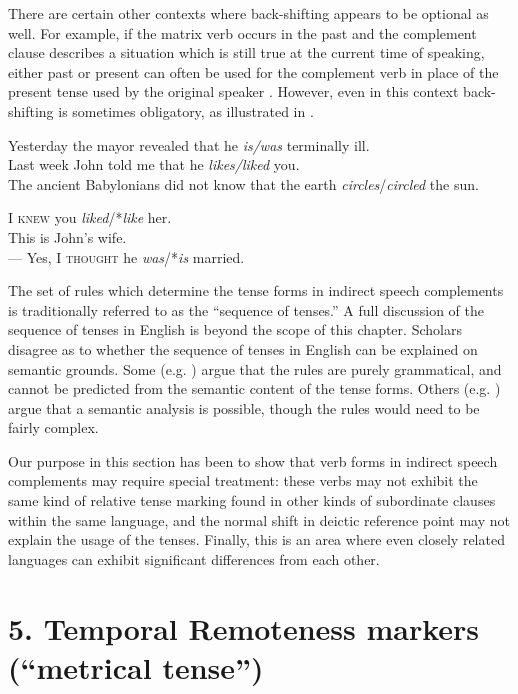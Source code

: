 There are certain other contexts where back-shifting appears to be optional as well. For example, if the matrix verb occurs in the past and the complement clause describes a situation which is still true at the current time of speaking, either past or present can often be used for the complement verb in place of the present tense used by the original speaker . However, even in this context back-shifting is sometimes obligatory, as illustrated in .


\ea
\ea Yesterday the mayor revealed that he \textit{is/was} terminally ill.\\
\ex Last week John told me that he \textit{likes/liked} you.\\
\ex The ancient Babylonians did not know that the earth \textit{circles}/\textit{circled} the sun.
                       \z
\z

\ea
\ea I \textsc{knew} you \textit{liked}/*\textit{like} her.\\
\ex This is John’s wife.\\
  — Yes, I \textsc{thought} he \textit{was}/*\textit{is} married.
                       \z
\z


The set of rules which determine the tense forms in indirect speech complements is traditionally referred to as the “sequence of tenses.” A full discussion of the sequence of tenses in English is beyond the scope of this chapter. Scholars disagree as to whether the sequence of tenses in English can be explained on semantic grounds. Some (e.g. \citealt{Comrie1985}) argue that the rules are purely grammatical, and cannot be predicted from the semantic content of the tense forms. Others (e.g. \citealt{Declerck1991}) argue that a semantic analysis is possible, though the rules would need to be fairly complex.



Our purpose in this section has been to show that verb forms in indirect speech complements may require special treatment: these verbs may not exhibit the same kind of relative tense marking found in other kinds of subordinate clauses within the same language, and the normal shift in deictic reference point may not explain the usage of the tenses. Finally, this is an area where even closely related languages can exhibit significant differences from each other.


\section{5. Temporal Remoteness markers (“metrical tense”)}\label{sec:}

